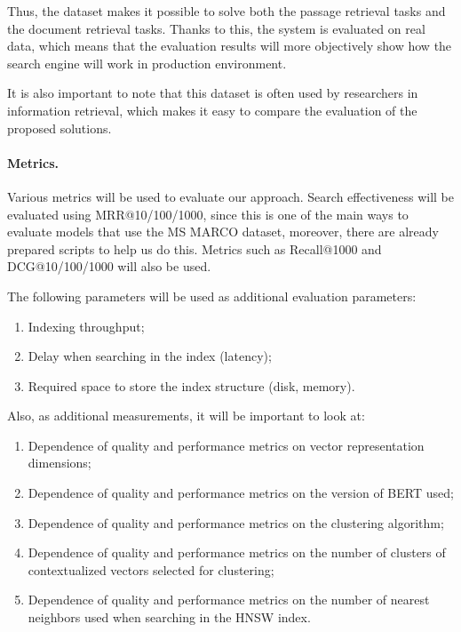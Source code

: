 \documentclass[
    twocolumn,
]{template/ceurart}
\begin{document}
    Thus, the dataset makes it possible to solve both the passage retrieval tasks and the document retrieval tasks.
    Thanks to this, the system is evaluated on real data, which means that the evaluation
    results will more objectively show how the search engine will work in production environment.

    It is also important to note that this dataset is often used by researchers in information retrieval,
    which makes it easy to compare the evaluation of the proposed solutions.

    \paragraph{Metrics.}
    Various metrics will be used to evaluate our approach.
    Search effectiveness will be evaluated using MRR@10/100/1000, since this is one of the main ways to evaluate
    models that use the MS MARCO dataset, moreover, there are already prepared scripts to help us do this.
    Metrics such as Recall@1000 and DCG@10/100/1000 will also be used.

    The following parameters will be used as additional evaluation parameters:
    \begin{enumerate}
        \item Indexing throughput;
        \item Delay when searching in the index (latency);
        \item Required space to store the index structure (disk, memory).
    \end{enumerate}

    Also, as additional measurements, it will be important to look at:
    \begin{enumerate}
        \item Dependence of quality and performance metrics on vector representation dimensions;
        \item Dependence of quality and performance metrics on the version of BERT used;
        \item Dependence of quality and performance metrics on the clustering algorithm;
        \item Dependence of quality and performance metrics on the number of clusters of contextualized
        vectors selected for clustering;
        \item Dependence of quality and performance metrics on the number of nearest neighbors used
        when searching in the HNSW index.
    \end{enumerate}
\end{document}
